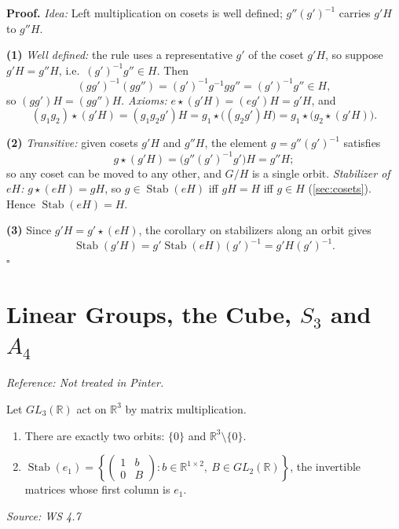 \documentclass[11pt]{report}
\renewenvironment{proof}[1][Proof]{\noindent\textbf{#1.} }{\hfill$\square$\par\vspace{5pt}}
\newcommand{\srcline}[1]{\par\hfill{\footnotesize\textit{Source: #1}}}
\begin{document}
\begin{proof}
\textit{Idea:} Left multiplication on cosets is well defined; $g''(g')^{-1}$ carries $g'H$ to $g''H$.\par
\textbf{(1)} \emph{Well defined:} the rule uses a representative $g'$ of the coset $g'H$, so suppose $g'H = g''H$, i.e.\ $(g')^{-1}g'' \in H$. Then
\[ (gg')^{-1}(gg'') = (g')^{-1}g^{-1}gg'' = (g')^{-1}g'' \in H, \]
so $(gg')H = (gg'')H$. \emph{Axioms:} $e \star (g'H) = (eg')H = g'H$, and
\[ (g_1g_2) \star (g'H) = (g_1g_2g')H = g_1 \star \big((g_2g')H\big) = g_1 \star \big(g_2 \star (g'H)\big). \]

\textbf{(2)} \emph{Transitive:} given cosets $g'H$ and $g''H$, the element $g = g''(g')^{-1}$ satisfies
\[ g \star (g'H) = \big(g''(g')^{-1}g'\big)H = g''H; \]
so any coset can be moved to any other, and $G/H$ is a single orbit. \emph{Stabilizer of $eH$:} $g \star (eH) = gH$, so $g \in \operatorname{Stab}(eH)$ iff $gH = H$ iff $g \in H$ (\ref{sec:cosets}). Hence $\operatorname{Stab}(eH) = H$.

\textbf{(3)} Since $g'H = g' \star (eH)$, the corollary on stabilizers along an orbit gives
\[ \operatorname{Stab}(g'H) = g' \operatorname{Stab}(eH) (g')^{-1} = g'H(g')^{-1}. \]
\end{proof}

\section{\texorpdfstring{Linear Groups, the Cube, $S_3$ and $A_4$}{Linear Groups, the Cube, S₃ and A₄}}\label{sec:action-examples}

\textit{Reference: Not treated in Pinter.}

\begin{propbox}\label{prop:gl3-r-acting-r3}
Let $GL_3(\mathbb{R})$ act on $\mathbb{R}^3$ by matrix multiplication.
\begin{enumerate}
    \item There are exactly two orbits: $\{0\}$ and $\mathbb{R}^3 \setminus \{0\}$.
    \item $\operatorname{Stab}(e_1) = \left\{ \begin{pmatrix} 1 & b \\ 0 & B \end{pmatrix} : b \in \mathbb{R}^{1 \times 2},\ B \in GL_2(\mathbb{R}) \right\}$, the invertible matrices whose first column is $e_1$.
\end{enumerate}
\srcline{WS 4.7}
\end{propbox}
\end{document}
